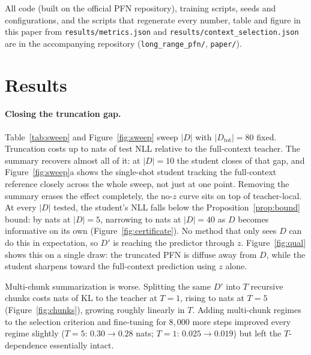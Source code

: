 \documentclass{article}
\newcommand{\Dtot}{D_{\mathrm{tot}}}
\newcommand{\Dfar}{D'}
\newcommand{\Dloc}{D}
\begin{document}
All code (built on the official PFN repository), training scripts, seeds
and configurations, and the scripts that regenerate every number, table
and figure in this paper from \texttt{results/metrics.json} and
\texttt{results/context\_selection.json} are in the
accompanying repository (\texttt{long\_range\_pfn/}, \texttt{paper/}).

\section{Results}
\label{sec:results}

\paragraph{Closing the truncation gap.} Table~\ref{tab:sweep} and
Figure~\ref{fig:sweep} sweep $|\Dloc|$ with $|\Dtot|=80$ fixed. Truncation
costs up to \truncgapmax{} nats of test NLL relative to the full-context
teacher. The summary recovers almost all of it: at $|\Dloc|=10$ the
student closes \shortclosepct{} of that gap, and Figure~\ref{fig:sweep}a
shows the single-shot student tracking the full-context reference closely
across the whole sweep, not just at one point. Removing the summary erases
the effect completely, the no-$z$ curve sits on top of teacher-local.
At every $|\Dloc|$ tested, the student's NLL falls below
the Proposition~\ref{prop:bound} bound: by \certmarginmax{} nats at
$|\Dloc|=5$, narrowing to \certmarginmin{} nats at $|\Dloc|=40$ as $\Dloc$
becomes informative on its own (Figure~\ref{fig:certificate}). No method
that only sees $\Dloc$ can do this in expectation, so $\Dfar$ is reaching
the predictor through $z$. Figure~\ref{fig:qual} shows this on a single
draw: the truncated PFN is diffuse away from $\Dloc$, while the student
sharpens toward the full-context prediction using $z$ alone.

Multi-chunk summarization is worse. Splitting the same $\Dfar$ into $T$
recursive chunks costs \chunkonekl{} nats of KL to the teacher at $T=1$,
rising to \chunkfivekl{} nats at $T=5$ (Figure~\ref{fig:chunks}), growing
roughly linearly in $T$. Adding multi-chunk regimes to the selection criterion and
fine-tuning for $8{,}000$ more steps improved every regime slightly
($T=5$: $0.30 \to 0.28$ nats; $T=1$: $0.025 \to 0.019$) but left the
$T$-dependence essentially intact.

\begin{table}[t]
\centering
\caption{Predictive quality vs.\ size of the direct context $\Dloc$, with
$|\Dtot| = 80$ fixed and $\Dfar$ the remainder ($3{,}200$ prior data sets,
$40$ query points each). Left block: NLL of held-out targets (nats, lower is
better). Right block: KL from the full-context teacher (nats/point).}
\label{tab:sweep}
\resizebox{\textwidth}{!}{}
\end{table}
\end{document}
